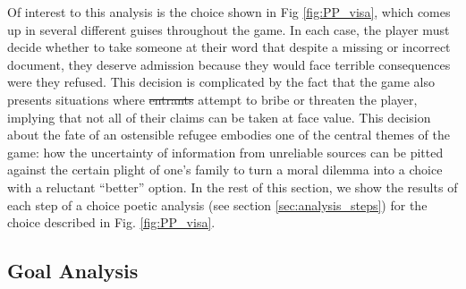 \documentclass[arts,article,submit,moreauthors,pdftex,10pt,a4paper]{Definitions/mdpi}
\providecommand{\DIFadd}[1]{{\protect\color{blue}\uwave{#1}}} %
\providecommand{\DIFdel}[1]{{\protect\color{red}\sout{#1}}}                      %
\providecommand{\DIFaddbegin}{} %
\providecommand{\DIFaddend}{} %
\providecommand{\DIFdelbegin}{} %
\providecommand{\DIFdelend}{} %
\begin{document}
Of interest to this analysis is the choice shown in Fig \ref{fig:PP_visa}, which comes up in several different guises throughout the game.
%
In each case, the player must decide whether to take someone at their word that despite a missing or incorrect document, they deserve admission because they would face terrible consequences were they refused.
%
This decision is complicated by the fact that the game also presents situations where \DIFdelbegin \DIFdel{entrants }\DIFdelend \DIFaddbegin \DIFadd{applicants }\DIFaddend attempt to bribe or threaten the player, implying that not all of their claims can be taken at face value.
%
This decision about the fate of an ostensible refugee embodies one of the central themes of the game: how the uncertainty of information from unreliable sources can be pitted against the certain plight of one's family to turn a moral dilemma into a choice with a reluctant ``better'' option.
%
In the rest of this section, we show the results of each step of a choice poetic analysis (see section \ref{sec:analysis_steps}) for the choice described in Fig. \ref{fig:PP_visa}.

\subsection{Goal Analysis}
\end{document}
